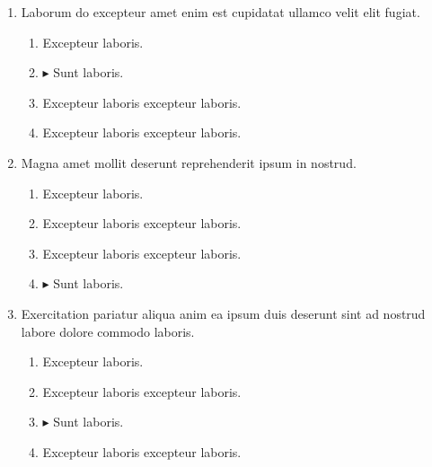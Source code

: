 \documentclass[a4paper,12pt]{article}
\begin{document}
\begin{enumerate}[label=\textbf{\arabic*.}]
\item Laborum do excepteur amet enim est cupidatat ullamco velit elit fugiat.
\begin{multicols}{2}
	\begin{enumerate}
		\item  Excepteur laboris.
    
		\item $\blacktriangleright$  Sunt laboris.
    
		\item  Excepteur laboris excepteur laboris.
  
		\item  Excepteur laboris excepteur laboris.
    
	\end{enumerate}

\end{multicols}
\item Magna amet mollit deserunt reprehenderit ipsum in nostrud.
\begin{multicols}{2}
	\begin{enumerate}
		\item  Excepteur laboris.
    
		\item  Excepteur laboris excepteur laboris.
    
		\item  Excepteur laboris excepteur laboris.
  
		\item $\blacktriangleright$  Sunt laboris.
    
	\end{enumerate}

\end{multicols}
\item Exercitation pariatur aliqua anim ea ipsum duis deserunt sint ad nostrud labore dolore commodo laboris.
\begin{multicols}{2}
	\begin{enumerate}
		\item  Excepteur laboris.
    
		\item  Excepteur laboris excepteur laboris.
  
		\item $\blacktriangleright$  Sunt laboris.
    
		\item  Excepteur laboris excepteur laboris.
    

\end{enumerate}
\end{multicols}
\end{enumerate}
\end{document}
